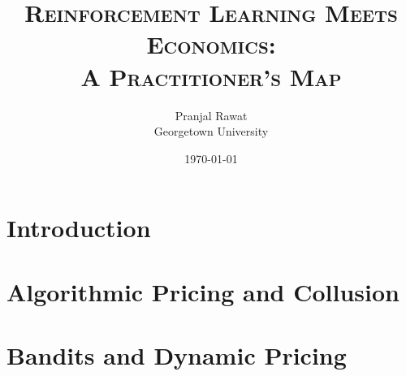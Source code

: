 %
%





\title{\textsc{Reinforcement Learning Meets Economics:\\ A Practitioner's Map}}
\author{Pranjal Rawat \\ Georgetown University}
\date{\today}

\maketitle

\begin{abstract}
\noindent
\end{abstract}


\section{Introduction}\label{section:intro}

\section{Algorithmic Pricing and Collusion}\label{section:games}

\section{Bandits and Dynamic Pricing}\label{section:bandits}

